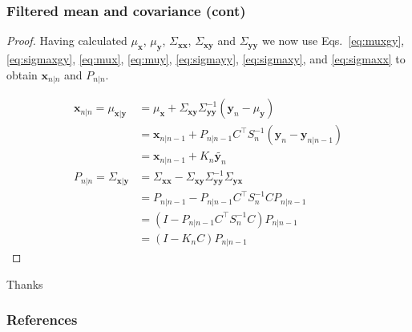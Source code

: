 \begin{frame}
    \frametitle{Filtered mean and covariance (cont)}
    \scriptsize

    \begin{proof}
    Having calculated $\mu_{\mathbf{x}}$, $\mu_{\mathbf{y}}$,
    $\Sigma_{\mathbf{x}\mathbf{x}}$, $\Sigma_{\mathbf{x}\mathbf{y}}$ and
    $\Sigma_{\mathbf{y}\mathbf{y}}$ we now use Eqs.~\ref{eq:muxgy},
    \ref{eq:sigmaxgy}, \ref{eq:mux},  \ref{eq:muy},  \ref{eq:sigmayy},
    \ref{eq:sigmaxy}, and \ref{eq:sigmaxx} to  
    obtain $\mathbf{x}_{n|n}$ and $P_{n|n}$.

    \begin{align*}
        \mathbf{x}_{n|n}=\mu_{\mathbf{x}|\mathbf{y}}&=\mu_{\mathbf{x}} + \Sigma_{\mathbf{x}\mathbf{y}}\Sigma_{\mathbf{y}\mathbf{y}}^{-1}(\mathbf{y}_n-\mu_{\mathbf{y}})\\
                                                    &=\mathbf{x}_{n|n-1}+P_{n|n-1}C^\intercal S_n^{-1}(\mathbf{y}_n-\mathbf{y}_{n|n-1})\\
                                                    &=\mathbf{x}_{n|n-1}+K_n\tilde{\mathbf{y}_n}\\
        P_{n|n}=\Sigma_{\mathbf{x}|\mathbf{y}}&=\Sigma_{\mathbf{x}\mathbf{x}}-\Sigma_{\mathbf{x}\mathbf{y}}\Sigma_{\mathbf{y}\mathbf{y}}^{-1}\Sigma_{\mathbf{y}\mathbf{x}}\\
                                              &=P_{n|n-1}-P_{n|n-1}C^\intercal S_n^{-1}CP_{n|n-1}\\
                                              &=(I-P_{n|n-1}C^\intercal S_n^{-1}C)P_{n|n-1}\\
                                              &=(I-K_nC)P_{n|n-1}
    \end{align*}
    \end{proof}
    \normalsize
\end{frame}

\begin{frame}
\Huge{\centerline{Thanks}}
\end{frame}

\begin{frame}
\frametitle{References}
\tiny{


}
\end{frame}


 

